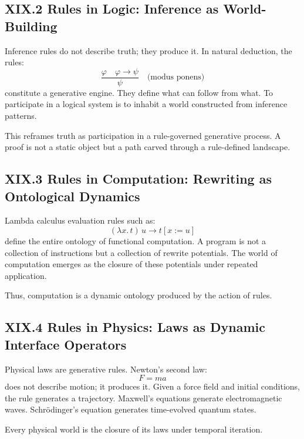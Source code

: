\documentclass[11pt,letterpaper]{article}
\begin{document}
\subsection{XIX.2 Rules in Logic: Inference as World-Building}

Inference rules do not describe truth; they produce it. In natural deduction, the rules:
\[
\frac{\varphi \quad \varphi \to \psi}{\psi}
\quad\text{(modus ponens)}
\]
constitute a generative engine. They define what can follow from what. To participate in a logical system is to inhabit a world constructed from inference patterns.

This reframes truth as participation in a rule-governed generative process. A proof is not a static object but a path carved through a rule-defined landscape.

\subsection{XIX.3 Rules in Computation: Rewriting as Ontological Dynamics}

Lambda calculus evaluation rules such as:
\[
(\lambda x.\, t)\, u \to t[x := u]
\]
define the entire ontology of functional computation. A program is not a collection of instructions but a collection of rewrite potentials. The world of computation emerges as the closure of these potentials under repeated application.

Thus, computation is a dynamic ontology produced by the action of rules.

\subsection{XIX.4 Rules in Physics: Laws as Dynamic Interface Operators}

Physical laws are generative rules. Newton’s second law:
\[
F = ma
\]
does not describe motion; it produces it. Given a force field and initial conditions, the rule generates a trajectory. Maxwell’s equations generate electromagnetic waves. Schrödinger’s equation generates time-evolved quantum states.

Every physical world is the closure of its laws under temporal iteration.
\end{document}
